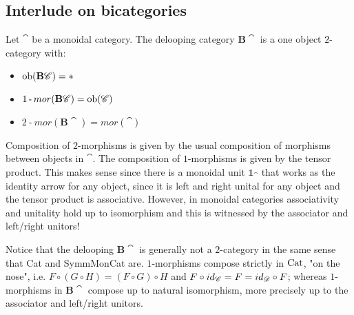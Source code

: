 \subsection{Interlude on bicategories \extra} %
\label{sub:outlook_interlude_on_bicategories}
\begin{defn}\label{DeloopingMonCat}
    Let $\cat$ be a monoidal category. The delooping category $\mathbf{B}\cat$ is a one object $2$-category with: \begin{itemize}
        \item $\operatorname{ob}(\mathbf{B}\mathscr{C})=\ast$
        \item $1\operatorname{-}mor(\mathbf{B}\mathscr{C})=\operatorname{ob}(\mathscr{C})$
        \item $2\operatorname{-}mor(\mathbf{B}\cat)=mor(\cat)$
    \end{itemize}
    Composition of $2$-morphisms is given by the usual composition of morphisms between objects in $\cat$. The composition of $1$-morphisms is given by the tensor product. This makes sense since there is a monoidal unit $\mathbb{1}_\cat$ that works as the identity arrow for any object, since it is left and right unital for any object and the tensor product is associative. However, in monoidal categories associativity and unitality hold up to isomorphism and this is witnessed by the associator and left/right unitors!
\end{defn}
\begin{rem}
    Notice that the delooping $\mathbf{B}\cat$ is generally not a $2$-category in the same sense that Cat and SymmMonCat are. $1$-morphisms compose strictly in $\operatorname{Cat}$, "on the nose", i.e. $F\circ(G\circ H)=(F\circ G)\circ H$ and $F\circ id_{\mathscr{C}} =F=id_{\mathscr{D}}\circ F$; whereas $1$-morphisms in $\mathbf{B}\cat$ compose up to natural isomorphism, more precisely up to the associator and left/right unitors.
\end{rem}
